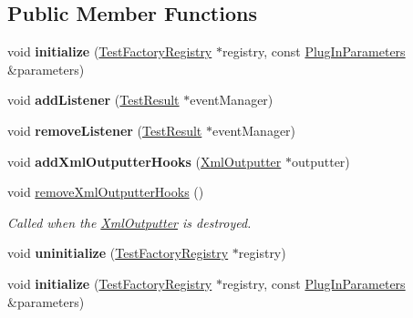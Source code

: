 \subsection*{Public Member Functions}
\begin{DoxyCompactItemize}
\item 
\hypertarget{class_test_plug_in_default_impl_a37c0b83c0a94ef97113b35ae70316883}{void {\bfseries initialize} (\hyperlink{class_test_factory_registry}{Test\+Factory\+Registry} $\ast$registry, const \hyperlink{class_plug_in_parameters}{Plug\+In\+Parameters} \&parameters)}\label{class_test_plug_in_default_impl_a37c0b83c0a94ef97113b35ae70316883}

\item 
\hypertarget{class_test_plug_in_default_impl_a0180a801dd78be5741a200e866684b20}{void {\bfseries add\+Listener} (\hyperlink{class_test_result}{Test\+Result} $\ast$event\+Manager)}\label{class_test_plug_in_default_impl_a0180a801dd78be5741a200e866684b20}

\item 
\hypertarget{class_test_plug_in_default_impl_a26364a3a81e48ff9adcef1a5cd3e40df}{void {\bfseries remove\+Listener} (\hyperlink{class_test_result}{Test\+Result} $\ast$event\+Manager)}\label{class_test_plug_in_default_impl_a26364a3a81e48ff9adcef1a5cd3e40df}

\item 
\hypertarget{class_test_plug_in_default_impl_aed4c5b89adaa0bb0b4f11cc4aca782a2}{void {\bfseries add\+Xml\+Outputter\+Hooks} (\hyperlink{class_xml_outputter}{Xml\+Outputter} $\ast$outputter)}\label{class_test_plug_in_default_impl_aed4c5b89adaa0bb0b4f11cc4aca782a2}

\item 
void \hyperlink{class_test_plug_in_default_impl_aa4fa891e799ff362dece734417afd93d}{remove\+Xml\+Outputter\+Hooks} ()
\begin{DoxyCompactList}\small\item\em Called when the \hyperlink{class_xml_outputter}{Xml\+Outputter} is destroyed. \end{DoxyCompactList}\item 
\hypertarget{class_test_plug_in_default_impl_aab567f339bbda38e759b7bd631ad8b8c}{void {\bfseries uninitialize} (\hyperlink{class_test_factory_registry}{Test\+Factory\+Registry} $\ast$registry)}\label{class_test_plug_in_default_impl_aab567f339bbda38e759b7bd631ad8b8c}

\item 
\hypertarget{class_test_plug_in_default_impl_a37c0b83c0a94ef97113b35ae70316883}{void {\bfseries initialize} (\hyperlink{class_test_factory_registry}{Test\+Factory\+Registry} $\ast$registry, const \hyperlink{class_plug_in_parameters}{Plug\+In\+Parameters} \&parameters)}\label{class_test_plug_in_default_impl_a37c0b83c0a94ef97113b35ae70316883}


\end{DoxyCompactItemize}
